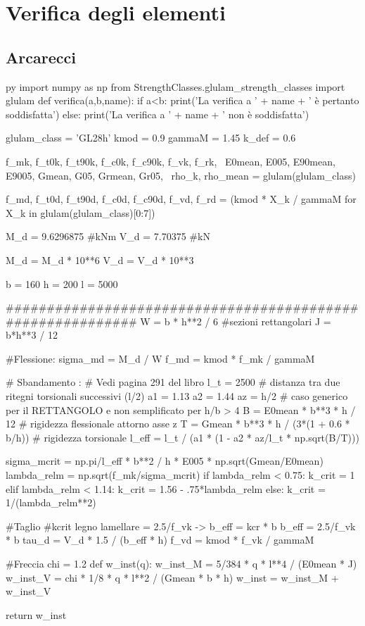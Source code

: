 \chapter{Verifica degli elementi}
\section{Arcarecci}

\begin{pythontexcustomcode}{py}
import numpy as np
from StrengthClasses.glulam_strength_classes import glulam
def verifica(a,b,name):
    if a<b:
        print('La verifica a ' + name + ' è pertanto soddisfatta')
    else:
        print('La verifica a ' + name + ' non è soddisfatta')
\end{pythontexcustomcode}

\begin{pycode}[arcarecci]
glulam_class = 'GL28h'
kmod = 0.9
gammaM = 1.45
k_def = 0.6

f_mk, f_t0k, f_t90k, f_c0k, f_c90k, f_vk, f_rk, \
E0mean, E005, E90mean, E9005, Gmean, G05, Grmean, Gr05, \
rho_k, rho_mean = glulam(glulam_class)

f_md, f_t0d, f_t90d, f_c0d, f_c90d, f_vd, f_rd = (kmod * X_k / gammaM for X_k in glulam(glulam_class)[0:7])

M_d = 9.6296875 #kNm
V_d = 7.70375 #kN

M_d = M_d * 10**6 
V_d = V_d * 10**3 

b = 160
h = 200
l = 5000

###########################################################
W = b * h**2 / 6 #sezioni rettangolari
J = b*h**3 / 12

#Flessione:
sigma_md = M_d / W
f_md = kmod * f_mk / gammaM

# Sbandamento :
# Vedi pagina 291 del libro
l_t = 2500 # distanza tra due ritegni torsionali successivi (l/2)
a1 = 1.13
a2 = 1.44
az = h/2
# caso generico per il RETTANGOLO e non semplificato per h/b > 4
B = E0mean * b**3 * h / 12 # rigidezza flessionale attorno asse z
T = Gmean * b**3 * h / (3*(1 + 0.6 * b/h)) # rigidezza torsionale 
l_eff = l_t / (a1 * (1 - a2 * az/l_t * np.sqrt(B/T)))

sigma_mcrit = np.pi/l_eff * b**2 / h * E005 * np.sqrt(Gmean/E0mean)
lambda_relm = np.sqrt(f_mk/sigma_mcrit)
if lambda_relm < 0.75:
    k_crit = 1
elif lambda_relm < 1.14:
    k_crit = 1.56 - .75*lambda_relm
else:
    k_crit = 1/(lambda_relm**2)


#Taglio    
#kcrit legno lamellare = 2.5/f_vk -> b_eff = kcr * b
b_eff = 2.5/f_vk * b
tau_d = V_d * 1.5 / (b_eff * h)
f_vd = kmod * f_vk / gammaM

#Freccia
chi = 1.2
def w_inst(q): 
    w_inst_M = 5/384 * q * l**4 / (E0mean * J)
    w_inst_V = chi * 1/8 * q * l**2 / (Gmean * b * h)
    w_inst = w_inst_M + w_inst_V
    
    return w_inst

\end{pycode}

